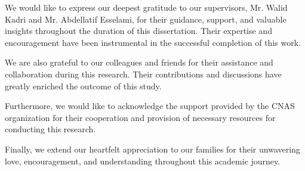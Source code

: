 \documentclass[12pt]{report}
\begin{document}
        \medskip

        We would like to express our deepest gratitude to our supervisors, Mr. Walid Kadri and Mr. Abdellatif Esselami, for their guidance, support, and valuable insights throughout the duration of this dissertation. Their expertise and encouragement have been instrumental in the successful completion of this work.
        
        \medskip
        
        We are also grateful to our colleagues and friends for their assistance and collaboration during this research. Their contributions and discussions have greatly enriched the outcome of this study.
        
        \medskip
        
        Furthermore, we would like to acknowledge the support provided by the CNAS organization for their cooperation and provision of necessary resources for conducting this research.
        
        
       \medskip
        Finally, we extend our heartfelt appreciation to our families for their unwavering love, encouragement, and understanding throughout this academic journey.
        
\end{document}
